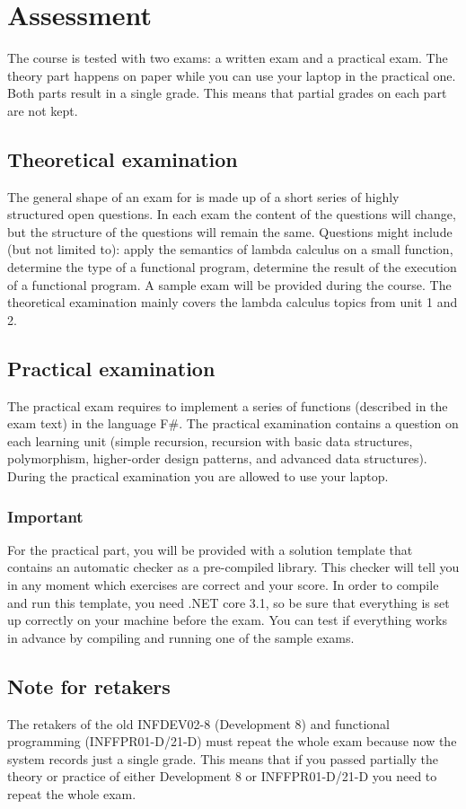 \section{Assessment}
The course is tested with two exams: a written exam and a practical exam. The theory part happens on paper while you can use your laptop in the practical one. Both parts result in a single grade. This means that partial grades on each part are not kept. 

\subsection{Theoretical examination \modulecode}
The general shape of an exam for \texttt{\modulecode} is made up of a short series of highly structured open questions.
In each exam the content of the questions will change, but the structure of the questions will remain the same. Questions might include (but not limited to): apply the semantics of lambda calculus on a small function, determine the type of a functional program, determine the result of the execution of a functional program. A sample exam will be provided during the course. The theoretical examination mainly covers the lambda calculus topics from unit 1 and 2.

\subsection{Practical examination \modulecode}
The practical exam requires to implement a series of functions (described in the exam text) in the language F\#. The practical examination contains a question on each learning unit (simple recursion, recursion with basic data structures, polymorphism, higher-order design patterns, and advanced data structures). During the practical examination you are allowed to use your laptop.

\subsubsection{Important}
For the practical part, you will be provided with a solution template that contains an automatic checker as a pre-compiled library. This checker will tell you in any moment which exercises are correct and your score. In order to compile and run this template, you need .NET core 3.1, so be sure that everything is set up correctly on your machine before the exam. You can test if everything works in advance by compiling and running one of the sample exams.

\subsection{Note for retakers}
The retakers of the old INFDEV02-8 (Development 8) and functional programming (INFFPR01-D/21-D) must repeat the whole exam because now the system records just a single grade. This means that if you passed partially the theory or practice of either Development 8 or INFFPR01-D/21-D you need to repeat the whole exam.
